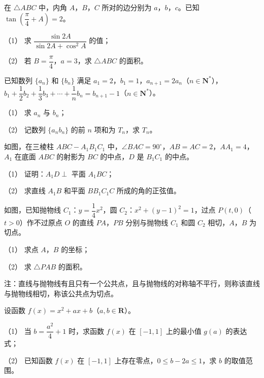 \begin{question}
在 \(\triangle ABC\) 中，内角 \(A\)，\(B\)，\(C\) 所对的边分别为 \(a\)，\(b\)，\(c\)。已知 \(\tan\left(\dfrac{\pi}{4}+A\right)=2\)。

（1） 求 \(\dfrac{\sin 2A}{\sin 2A+\cos^2A}\) 的值；

（2） 若 \(B=\dfrac{\pi}{4}\)，\(a=3\)，求 \(\triangle ABC\) 的面积。

\end{question}
\begin{question}
已知数列 \(\{a_n\}\) 和 \(\{b_n\}\) 满足 \(a_1=2\)，\(b_1=1\)，\(a_{n+1}=2a_n\)（\(n\in\mathbf{N}^*\)），\(b_1+\dfrac{1}{2}b_2+\dfrac{1}{3}b_3+\cdots+\dfrac{1}{n}b_n=b_{n+1}-1\)（\(n\in\mathbf{N}^*\)）。

（1） 求 \(a_n\) 与 \(b_n\)；

（2） 记数列 \(\{a_nb_n\}\) 的前 \(n\) 项和为 \(T_n\)，求 \(T_n\)。

\Needspace{0.4\textheight}
\end{question}
\begin{question}
如图，在三棱柱 \(ABC-A_1B_1C_1\) 中，\(\angle BAC=90^\circ\)，\(AB=AC=2\)，\(AA_1=4\)，\(A_1\) 在底面 \(ABC\) 的射影为 \(BC\) 的中点，\(D\) 是 \(B_1C_1\) 的中点。

（1） 证明：\(A_1D\perp\) 平面 \(A_1BC\)；

（2） 求直线 \(A_1B\) 和平面 \(BB_1C_1C\) 所成的角的正弦值。
\nopagebreak[4]
\begin{center}\end{center}
\nopagebreak[4]
\Needspace{0.4\textheight}
\end{question}
\begin{question}
如图，已知抛物线 \(C_1\)：\(y=\dfrac{1}{4}x^2\)，圆 \(C_2\)：\(x^2+(y-1)^2=1\)，过点 \(P(t,0)\)（\(t>0\)）作不过原点 \(O\) 的直线 \(PA\)，\(PB\) 分别与抛物线 \(C_1\) 和圆 \(C_2\) 相切，\(A\)，\(B\) 为切点。

（1） 求点 \(A\)，\(B\) 的坐标；

（2） 求 \(\triangle PAB\) 的面积。

注：直线与抛物线有且只有一个公共点，且与抛物线的对称轴不平行，则称该直线与抛物线相切，称该公共点为切点。
\nopagebreak[4]
\begin{center}\end{center}
\nopagebreak[4]
\end{question}
\begin{question}
设函数 \(f(x)=x^2+ax+b\)（\(a,b\in\mathbf{R}\)）。

（1） 当 \(b=\dfrac{a^2}{4}+1\) 时，求函数 \(f(x)\) 在 \([-1,1]\) 上的最小值 \(g(a)\) 的表达式；

（2） 已知函数 \(f(x)\) 在 \([-1,1]\) 上存在零点，\(0\leqslant b-2a\leqslant1\)，求 \(b\) 的取值范围。

\end{question}